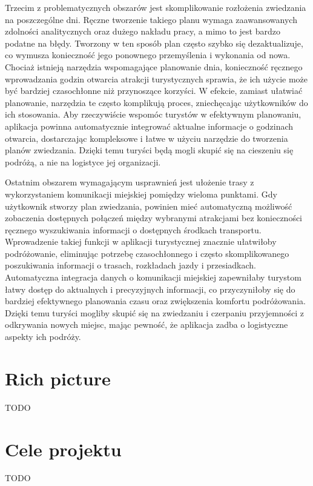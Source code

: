 Trzecim z problematycznych obszarów jest skomplikowanie rozłożenia zwiedzania na poszczególne dni.
Ręczne tworzenie takiego planu wymaga zaawansowanych zdolności analitycznych oraz dużego nakładu pracy, a mimo to jest bardzo podatne na błędy.
Tworzony w ten sposób plan często szybko się dezaktualizuje, co wymusza konieczność jego ponownego przemyślenia i wykonania od nowa.
Chociaż istnieją narzędzia wspomagające planowanie dnia, konieczność ręcznego wprowadzania godzin otwarcia atrakcji turystycznych sprawia, że ich użycie może być bardziej czasochłonne niż przynoszące korzyści.
W efekcie, zamiast ułatwiać planowanie, narzędzia te często komplikują proces, zniechęcając użytkowników do ich stosowania.
Aby rzeczywiście wspomóc turystów w efektywnym planowaniu, aplikacja powinna automatycznie integrować aktualne informacje o godzinach otwarcia, dostarczając kompleksowe i łatwe w użyciu narzędzie do tworzenia planów zwiedzania.
Dzięki temu turyści będą mogli skupić się na cieszeniu się podróżą, a nie na logistyce jej organizacji.

Ostatnim obszarem wymagającym usprawnień jest ułożenie trasy z wykorzystaniem komunikacji miejskiej pomiędzy wieloma punktami.
Gdy użytkownik stworzy plan zwiedzania, powinien mieć automatyczną możliwość zobaczenia dostępnych połączeń między wybranymi atrakcjami bez konieczności ręcznego wyszukiwania informacji o dostępnych środkach transportu.
Wprowadzenie takiej funkcji w aplikacji turystycznej znacznie ułatwiłoby podróżowanie, eliminując potrzebę czasochłonnego i często skomplikowanego poszukiwania informacji o trasach, rozkładach jazdy i przesiadkach.
Automatyczna integracja danych o komunikacji miejskiej zapewniłaby turystom łatwy dostęp do aktualnych i precyzyjnych informacji, co przyczyniłoby się do bardziej efektywnego planowania czasu oraz zwiększenia komfortu podróżowania.
Dzięki temu turyści mogliby skupić się na zwiedzaniu i czerpaniu przyjemności z odkrywania nowych miejsc, mając pewność, że aplikacja zadba o logistyczne aspekty ich podróży.

\section{Rich picture}
\label{sec:rich-picture}

TODO

\section{Cele projektu}
\label{sec:cele-projektu}

TODO
